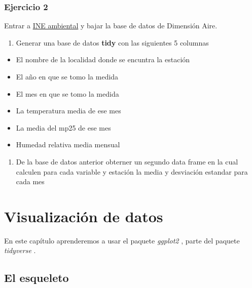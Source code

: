 \documentclass[]{book}
\providecommand{\tightlist}{%
  \setlength{\itemsep}{0pt}\setlength{\parskip}{0pt}}
\begin{document}
\hypertarget{ejercicio-2-1}{%
\subsection{Ejercicio 2}\label{ejercicio-2-1}}

Entrar a
\href{http://www.ine.cl/estadisticas/medioambiente/series-cronologicas-vba}{INE
ambiental} y bajar la base de datos de Dimensión Aire.

\begin{enumerate}
\def\labelenumi{\alph{enumi}.}
\tightlist
\item
  Generar una base de datos \textbf{tidy} con las siguientes 5 columnas
\end{enumerate}

\begin{itemize}
\tightlist
\item
  El nombre de la localidad donde se encuntra la estación
\item
  El año en que se tomo la medida
\item
  El mes en que se tomo la medida
\item
  La temperatura media de ese mes
\item
  La media del mp25 de ese mes
\item
  Humedad relativa media mensual
\end{itemize}

\begin{enumerate}
\def\labelenumi{\alph{enumi}.}
\setcounter{enumi}{1}
\tightlist
\item
  De la base de datos anterior obterner un segundo data frame en la cual
  calculen para cada variable y estación la media y desviación estandar
  para cada mes
\end{enumerate}

\hypertarget{visualizacion}{%
\chapter{Visualización de datos}\label{visualizacion}}

En este capítulo aprenderemos a usar el paquete \emph{ggplot2}
\citep{Wickhamggplot}, parte del paquete \emph{tidyverse}
\citep{Wickhamtidyverse}.

\hypertarget{el-esqueleto}{%
\section{El esqueleto}\label{el-esqueleto}}
\end{document}
